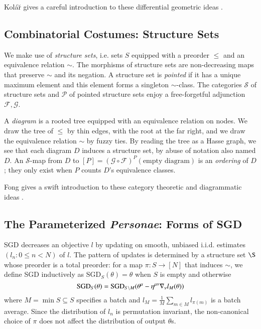 \documentclass{article}
\newcommand{\Free}{\mathcal{F}}
\newcommand{\Forg}{\mathcal{G}}
\newcommand{\Ss}{\mathcal{S}}
\newcommand{\Pp}{\mathcal{P}}
\newcommand{\SGD}{\text{\textnormal{SGD}}}
\begin{document}
    Kol\'{a}\u{r} gives a careful introduction to these differential geometric
    ideas .

\subsection{Combinatorial Costumes: Structure Sets}
    We make use of \emph{structure sets}, i.e.  sets $S$ equipped with a
    preorder $\leq$ and an equivalence relation $\sim$.  The morphisms of
    structure sets are  non-decreasing maps that preserve $\sim$ and its
    negation.  A structure set is \emph{pointed} if it has a unique maximum
    element and this element forms a singleton $\sim$-class.  The categories
    $\Ss$ of structure sets and $\Pp$ of pointed structure sets enjoy a
    free-forgetful adjunction $\Free, \Forg$.

    A \emph{diagram} is a rooted tree equipped with an equivalence relation on
    nodes.  We draw the tree of $\leq$ by thin edges, with the root at the far
    right, and we draw the equivalence relation $\sim$ by fuzzy ties.  By
    reading the tree as a Hasse graph, we see that each diagram $D$ induces a
    structure set, by abuse of notation also named $D$.  An $\Ss$-map from $D$
    to $[P]=(\Forg\circ\Free)^P(\text{empty diagram})$ is an \emph{ordering} of
    $D$; they only exist when $P$ counts $D$'s equivalence classes.

    Fong gives a swift introduction to these category theoretic and
    diagrammatic ideas .
        
\subsection{The Parameterized \emph{Personae}: Forms of SGD}
    SGD decreases an objective $l$ by updating on smooth, unbiased i.i.d.
    estimates $(l_n: 0\leq n<N)$ of $l$.  The pattern of updates is determined
    by a structure set $\S$ whose preorder is a total preorder: for a map $\pi:S\to
    [N]$ that induces $\sim$, we define SGD inductively as
    $\text{SGD}_{S}(\theta) = \theta$ when $S$ is empty and otherwise
    $$
        \SGD_S(\theta) =
            \SGD_{S\setminus M}(\theta^\mu - \eta^{\mu\nu} \nabla_\nu l_{M}(\theta))
    $$
    where $M = \min S \subseteq S$ specifies a batch and $l_M =
    \frac{1}{M} \sum_{m\in M} l_{\pi(m)}$ is a batch average.  Since the
    distribution of $l_n$ is permutation invariant, the non-canonical choice
    of $\pi$ does not affect the distribution of output $\theta$s.
\end{document}
